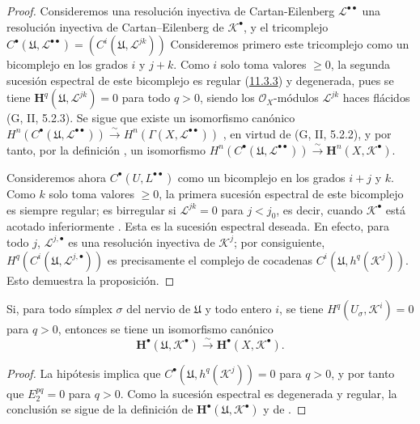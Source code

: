 \begin{proof}
Consideremos una resolución inyectiva de Cartan-Eilenberg $\mathcal L^{\bullet\bullet}$ una resolución inyectiva de
Cartan--Eilenberg de $\mathcal K^\bullet$, y el tricomplejo $C^\bullet(\mathfrak U,\mathcal L^{\bullet\bullet})
=(C^i(\mathfrak U,\mathcal L^{jk}))$
Consideremos primero este tricomplejo como un bicomplejo en los grados $i$ y
$j+k$.
Como $i$ solo toma valores $\geq0$, la segunda sucesión espectral de este bicomplejo es regular (\hyperref[0.11.3.3-fr]{11.3.3}) y degenerada, pues se tiene $\mathbf H^q(\mathfrak U,\mathcal L^{jk})=0$ para todo $q>0$, siendo los $\mathcal O_X$-módulos $\mathcal L^{jk}$ haces flácidos
(G, II, 5.2.3).
Se sigue que existe un isomorfismo canónico
$H^n(C^\bullet(\mathfrak U,\mathcal L^{\bullet\bullet}))\xrightarrow{\sim}H^n(\Gamma(X,\mathcal L^{\bullet\bullet}))$
, en virtud de (G, II, 5.2.2), y por tanto, por la
definición , un isomorfismo
$H^n(C^\bullet(\mathfrak U,\mathcal L^{\bullet\bullet}))\xrightarrow{\sim}\mathbf H^n(X,\mathcal K^\bullet)$.

Consideremos ahora
$C^\bullet(U,L^{\bullet\bullet})$
como un bicomplejo en los grados $i+j$ y $k$.
Como $k$ solo toma valores $\geq0$, la primera sucesión espectral de este bicomplejo es siempre regular; es birregular si $\mathcal L^{jk}=0$ para $j<j_0$, es decir, cuando
$\mathcal K^\bullet$ está acotado inferiormente .
Esta es la sucesión espectral deseada.
En efecto, para todo $j$, $\mathcal L^{j,\bullet}$ es una resolución
inyectiva de $\mathcal K^j$; por consiguiente,
$H^q(C^i(\mathfrak U,\mathcal L^{j,\bullet}))$
es precisamente el complejo de cocadenas
$C^i(\mathfrak U,h^q(\mathcal K^j))$.
Esto demuestra la proposición.
\end{proof}

\begin{corollary}[12.4.7]
\label{0.12.4.7}
\label{0.12.4.7-fr}
Si, para todo símplex $\sigma$ del nervio de $\mathfrak U$ y
todo entero $i$, se tiene $H^q(U_\sigma,\mathcal K^i)=0$ para $q>0$, entonces se tiene un isomorfismo canónico
\begin{equation}
\label{0.12.4.7.1-fr}
\tag{12.4.7.1}
\mathbf H^\bullet(\mathfrak U,\mathcal K^\bullet)
\xrightarrow{\sim}\mathbf H^\bullet(X,\mathcal K^\bullet).
\end{equation}
\end{corollary}

\begin{proof}
La hipótesis implica que
$C^\bullet(\mathfrak U,h^q(\mathcal K^j))=0$ para $q>0$, y por tanto que
$E_2^{pq}=0$ para $q>0$.
Como la sucesión espectral  es degenerada y
regular, la conclusión se sigue de la definición
 de
$\mathbf H^\bullet(\mathfrak U,\mathcal K^\bullet)$ y de
.
\end{proof}

